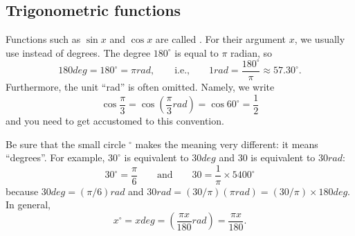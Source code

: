 \documentclass[11pt,pdfa,lastpage]{MishoNote}
\begin{document}
\begin{problems}
\end{problems}

\newpage

\subsection{Trigonometric functions}
Functions such as $\sin x$ and $\cos x$ are called . For their argument $x$, we usually use  instead of degrees. The degree $180^\circ$ is equal to $\pi$ radian, so
\begin{equation*}
  180\unit{deg} = 180^\circ = \pi\unit{rad},\qquad\text{i.e.,}\qquad 1\unit{rad}=\frac{180^\circ}\pi\approx57.30^\circ.
\end{equation*}
Furthermore, the unit ``rad'' is often omitted. Namely, we write
\begin{equation*}
  \cos\frac{\pi}{3} = \cos\left(\frac\pi3\unit{rad}\right) = \cos60^\circ = \frac12
\end{equation*}
and you need to get accustomed to this convention.

Be sure that the small circle $^\circ$ makes the meaning very different: it means ``degrees''. For example, $30^\circ$ is equivalent to $30\unit{deg}$ and $30$ is equivalent to $30\unit{rad}$:
\[
30^\circ = \frac\pi6 \qquad\text{and}\qquad 30 = \frac{1}{\pi}\times5400^\circ
\]
because $30\unit{deg}=(\pi/6)\unit{rad}$ and $30\unit{rad}=(30/\pi)(\pi\unit{rad})=(30/\pi)\times180\unit{deg}$.
In general,
\begin{equation}
 x^\circ=x\unit{deg}=\left(\frac{\pi x}{180}\unit{rad}\right)=\frac{\pi x}{180}.
 \end{equation}
\end{document}
